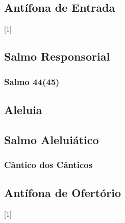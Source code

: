 
\subsection{Antífona de Entrada}\label{subsection:tempus-nativitatis/sanctae-dei-genetricis-mariae/introitus}
[1]

\AllowPageFlush

\subsection[Salmo Responsorial]{Salmo Responsorial}\label{subsection:tempus-nativitatis/sanctae-dei-genetricis-mariae/psalmus-responsorius}
\subsubsection{Salmo 44(45)}

\AllowPageFlush

\subsection{Aleluia}\label{subsection:tempus-nativitatis/sanctae-dei-genetricis-mariae/alleluia}

\AllowPageFlush

\subsection[Salmo Aleluiático]{Salmo Aleluiático}\label{subsection:tempus-nativitatis/sanctae-dei-genetricis-mariae/psalmus-alleluiaticus}
\subsubsection{Cântico dos Cânticos}

\AllowPageFlush

\subsection{Antífona de Ofertório}\label{subsection:tempus-nativitatis/sanctae-dei-genetricis-mariae/offertorium}
[1]

